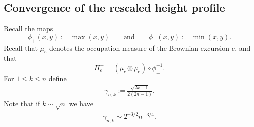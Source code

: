 \documentclass[english,11pt]{smfart}
\numberwithin{equation}{section}
\begin{document}
\subsection{Convergence of the rescaled height profile}
\label{sec:profile}



Recall the maps
\[
	\phi_+(x,y):=\max(x,y) \qquad \text{and} \qquad \phi_-(x,y):=\min(x,y).
\]
Recall that $\mu_e$ denotes the occupation measure of the Brownian excursion $e$, and that
\[
	\Pi_e^\pm = (\mu_e \otimes \mu_e) \circ \phi_\pm^{-1}.
\]
For $1 \le k \le n$ define
\begin{align*}
	\gamma_{n,k}:=\frac{\sqrt{2k-1}}{2(2n-1)}.
\end{align*}
Note that if $k \sim \sqrt{n}$ we have 
\begin{align}
	\label{eq:gammascale}
	\gamma_{n,k} \sim  2^{-3/2}n^{-3/4}.
\end{align}
\end{document}
